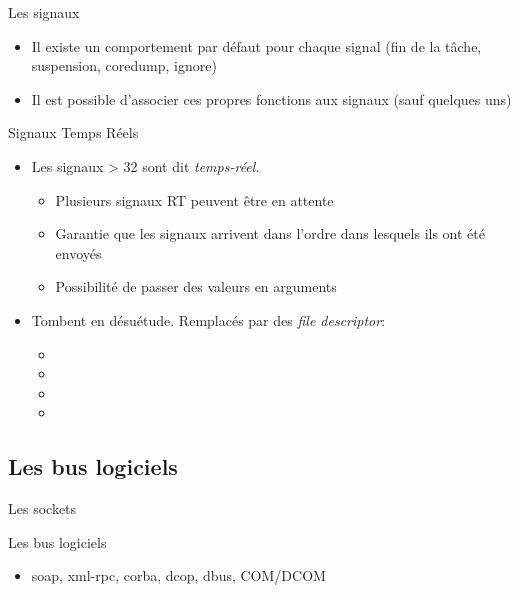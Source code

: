 \begin{frame}[fragile=singleslide]{Les signaux}
\begin{itemize}
\begin{columns}
      \begin{column}{3cm}
        \begin{itemize}
        \item 25: XFSZ
        \item 26: VTALRM
        \item 27: PROF
        \item 28: WINCH
        \item 29: POLL
        \item 30: PWR
        \item 31: SYS
        \end{itemize}
      \end{column}
    \end{columns}
    \vspace{2ex}
  \item Il existe  un comportement par défaut pour  chaque signal (fin
    de la tâche, suspension, coredump, ignore)
  \item Il  est possible d'associer ces propres  fonctions aux signaux
    (sauf quelques uns)
  \end{itemize}
\end{frame}

\begin{frame}[fragile=singleslide]{Signaux Temps Réels}
\begin{itemize}
\item Les signaux > 32 sont dit \emph{temps-réel}.
    \begin{itemize}
    \item Plusieurs signaux RT peuvent être en attente
    \item Garantie que les signaux arrivent dans l'ordre dans lesquels
      ils ont été envoyés
    \item Possibilité de passer des valeurs en arguments
    \end{itemize}
  \item Tombent en désuétude. Remplacés par des \emph{file descriptor}:
    \begin{itemize}
    \item {}
    \item {}
    \item {}
    \item {}
    \end{itemize}
  \end{itemize}
\end{frame}

\subsection{Les bus logiciels}

\begin{frame}[fragile=singleslide]{Les sockets}
\end{frame}

\begin{frame}[fragile=singleslide]{Les bus logiciels}
  \begin{itemize}
    \item soap, xml-rpc, corba, dcop, dbus, COM/DCOM
  \end{itemize}
\end{frame}



